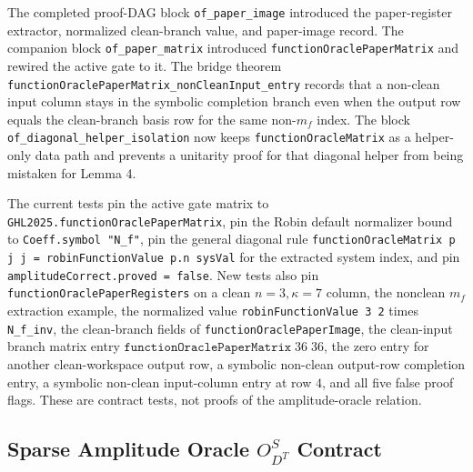The completed proof-DAG block \texttt{of\_paper\_image} introduced the
paper-register extractor, normalized clean-branch value, and paper-image
record.  The companion block \texttt{of\_paper\_matrix} introduced
\texttt{functionOraclePaperMatrix} and rewired the active gate to it.  The
bridge theorem
\texttt{functionOraclePaperMatrix\_nonCleanInput\_entry} records that a
non-clean input column stays in the symbolic completion branch even when the
output row equals the clean-branch basis row for the same non-\(m_f\) index.
The
block \texttt{of\_diagonal\_helper\_isolation} now keeps
\texttt{functionOracleMatrix} as a helper-only data path and prevents a
unitarity proof for that diagonal helper from being mistaken for Lemma 4.

The current tests pin the active gate matrix to
\texttt{GHL2025.functionOraclePaperMatrix}, pin the Robin default normalizer bound to
\texttt{Coeff.symbol "N\_f"}, pin the general diagonal rule
\texttt{functionOracleMatrix p j j =
robinFunctionValue p.n sysVal} for the extracted system index, and pin
\texttt{amplitudeCorrect.proved = false}.  New tests also pin
\texttt{functionOraclePaperRegisters} on a clean \(n=3,\kappa=7\) column,
the nonclean \(m_f\) extraction example, the normalized value
\texttt{robinFunctionValue 3 2} times \texttt{N\_f\_inv}, the clean-branch
fields of \texttt{functionOraclePaperImage}, the clean-input branch matrix
entry \(\texttt{functionOraclePaperMatrix}\;36\;36\), the zero entry for
another clean-workspace output row, a symbolic non-clean output-row completion
entry, a symbolic non-clean input-column entry at row \(4\), and all five false
proof flags.  These are contract tests, not proofs of the amplitude-oracle
relation.

\subsection{Sparse Amplitude Oracle $O_{D^T}^S$ Contract}

